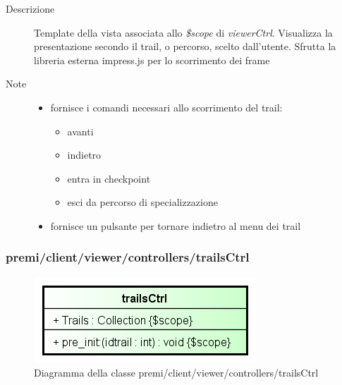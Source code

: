 \begin{description}
\item[Descrizione] \hfill
	Template della vista associata allo \textit{\$scope} di \textit{viewerCtrl}. Visualizza la presentazione secondo il trail, o percorso, scelto dall'utente. Sfrutta la libreria esterna impress.js per lo scorrimento dei frame
\item[Note] \hfill
	\begin{itemize}
			\item fornisce i comandi necessari allo scorrimento del trail:
				\begin{itemize}
					\item avanti
					\item indietro
					\item entra in checkpoint
					\item esci da percorso di specializzazione
				\end{itemize}
			\item fornisce un pulsante per tornare indietro al menu dei trail
	\end{itemize}
\end{description}











\subsubsection{premi/client/viewer/controllers/trailsCtrl}
\begin{figure}[H]
\begin{center}
\includegraphics[scale=0.85]{img/diacla/trailsCtrl.png}
\caption{Diagramma della classe premi/client/viewer/controllers/trailsCtrl}
\end{center}
\end{figure}


